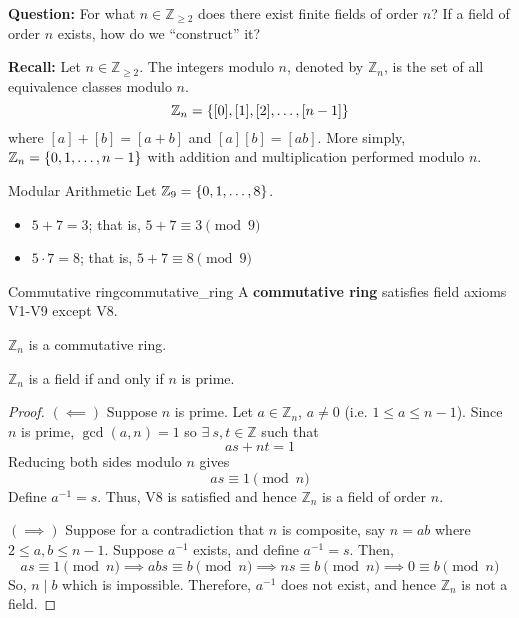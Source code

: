 \textbf{Question:} For what $ n\in\mathbb{Z}_{\geqslant 2} $ does there exist
finite fields of order $ n $? If a field of order $ n $ exists, how do
we ``construct'' it?

\textbf{Recall:} Let $ n\in\mathbb{Z}_{\geqslant 2} $.
The integers modulo $ n $, denoted by
$ \mathbb{Z}_n $, is the set of all equivalence classes modulo $ n $.
\[ \mathbb{Z}_n=\{[0],[1],[2],\ldots ,[n-1]\} \]
where $ [a]+[b]=[a+b] $ and $ [a][b]=[ab] $.
More simply, $ \mathbb{Z}_{n}=\{0,1,\ldots ,n-1\} $
with addition and multiplication performed modulo $ n $.

\begin{Example}{Modular Arithmetic}{}
    Let $ \mathbb{Z}_9=\{0,1,\ldots ,8\} $.
    \begin{itemize}
        \item $ 5+7=3 $; that is, $ 5+7\equiv 3 \pmod{9} $
        \item $ 5\cdot 7=8 $; that is, $ 5+7\equiv 8 \pmod{9} $
    \end{itemize}
\end{Example}

\begin{Definition}{Commutative ring}{commutative_ring}
    A \textbf{commutative ring} satisfies field axioms V1-V9 except
    V8.
\end{Definition}

\begin{Theorem}{}{}
    $ \mathbb{Z}_n $ is a commutative ring.
\end{Theorem}

\begin{Theorem}{}{}
    $ \mathbb{Z}_n $ is a field if and only if $ n $ is prime.
\end{Theorem}

\begin{proof}
    $ (\impliedby) $ Suppose $ n $ is prime. Let $ a\in\mathbb{Z}_n $, $ a\neq 0 $
    (i.e. $ 1\leqslant a\leqslant n-1 $). Since $ n $ is prime, $ \gcd(a,n)=1 $
    so $ \exists\ s,t\in\mathbb{Z} $ such that
    \[ as+nt=1 \]
    Reducing both sides modulo $ n $ gives
    \[ as\equiv 1 \pmod{n} \]
    Define $ a^{-1}=s $. Thus, V8 is satisfied and hence $ \mathbb{Z}_n $
    is a field of order $ n $.

    $ (\implies) $ Suppose for a contradiction that $ n $ is composite, say $ n=ab $
    where $ 2\leqslant a,b\leqslant n-1 $. Suppose $ a^{-1} $ exists, and define
    $ a^{-1}=s $. Then,
    \[ as\equiv 1 \pmod{n}\implies abs\equiv b\pmod{n}\implies ns\equiv b \pmod{n}
        \implies 0\equiv b\pmod{n} \]
    So, $ n\mid b $ which is impossible. Therefore, $ a^{-1} $ does not exist, and hence
    $ \mathbb{Z}_n $ is not a field.
\end{proof}

